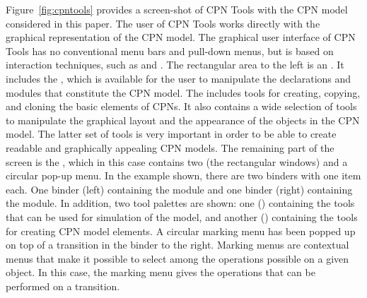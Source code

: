 Figure~\ref{fig:cpntools} provides a screen-shot of CPN Tools with the
CPN model considered in this paper. The user of CPN Tools works
directly with the graphical representation of the CPN model. The
graphical user interface of CPN Tools has no conventional menu bars
and pull-down menus, but is based on interaction techniques, such as
 and . The rectangular
area to the left is an . It includes the , which is available for the user to manipulate the declarations
and modules that constitute the CPN model. The 
includes tools for creating, copying, and cloning the basic elements
of CPNs. It also contains a wide selection of tools to manipulate the
graphical layout and the appearance of the objects in the CPN
model. The latter set of tools is very important in order to be able
to create readable and graphically appealing CPN models. The remaining
part of the screen is the , which in this case
contains two  (the rectangular windows) and a
circular pop-up menu. In the example shown, there are two
binders with one item each. One binder (left) containing the
 module and one binder (right) containing the
 module. In addition, two tool palettes are
shown: one () containing the tools that can be used for
simulation of the model, and another () containing the
tools for creating CPN model elements. A
circular marking menu has been popped up on top of a transition in the
binder to the right. Marking menus are contextual menus that make it
possible to select among the operations possible on a given object. In
this case, the marking menu gives the operations that can be performed
on a transition.




